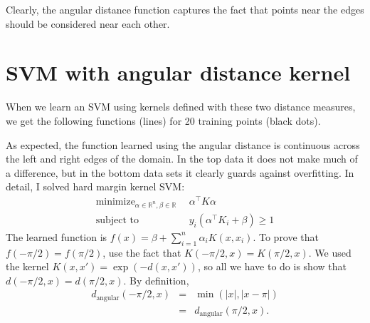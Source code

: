 \documentclass[11pt]{article}
\newcommand{\RR}{\mathbb R}
\DeclareMathOperator*{\minimize}{minimize}
\begin{document}


Clearly, the angular distance function captures the fact that points
near the edges should be considered near each other.

\newpage

\section{SVM with angular distance kernel}

When we learn an SVM using kernels defined with these two distance
measures, we get the following functions (lines) for 20 training
points (black dots).



As expected, the function learned using the angular distance is
continuous across the left and right edges of the domain. In the top
data it does not make much of a difference, but in the bottom data
sets it clearly guards against overfitting. In detail, I solved hard
margin kernel SVM:
\begin{equation}
  \label{eq:hard-margin-kernel-svm}
  \begin{aligned}
      \minimize_{\alpha\in\RR^n,\beta\in\RR}\ \  & 
  \alpha^\intercal K \alpha\\
  \text{subject to}\ \ & y_i(\alpha^\intercal K_i + \beta) \geq 1
  \end{aligned}
\end{equation}
The learned function is $f(x) = \beta + \sum_{i=1}^n
\alpha_iK(x,x_i)$. To prove that $f(-\pi/2)=f(\pi/2)$, use the fact
that $K(-\pi/2,x)=K(\pi/2,x)$. We used the kernel $K(x,x') = \exp(-
d(x,x'))$, so all we have to do is show that
$d(-\pi/2,x)=d(\pi/2,x)$. By definition,
\begin{eqnarray*}
  d_{\text{angular}}(-\pi/2, x)
&=&\min(|x|, |x-\pi|)\\
&=&d_{\text{angular}}(\pi/2, x).
\end{eqnarray*}

%
%
\end{document}
